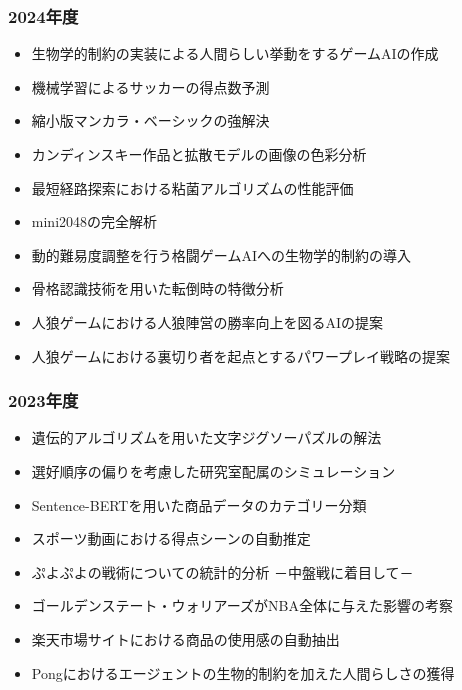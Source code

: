 \documentclass[paper=a4paper,fontsize=10.4pt]{jlreq}
\begin{document}
\begin{tcolorbox}[
colframe=gray, colback=white,
coltitle=white, colbacktitle=gray,
boxrule=0.8pt, arc=0mm,
outer arc=0mm,
sharp corners,
fonttitle=\bfseries,
enhanced,
attach boxed title to top left={xshift=5mm,yshift=-3mm},
boxed title style={frame hidden},
title=過去の卒業研究題目（過去4期分）
]
\begin{multicols}{2}
\fontsize{8bp}{11pt}\selectfont
\subsubsection*{2024年度}
\begin{itemize}[leftmargin=3mm]
  \item 生物学的制約の実装による人間らしい挙動をするゲームAIの作成
  \item 機械学習によるサッカーの得点数予測
  \item 縮小版マンカラ・ベーシックの強解決
  \item カンディンスキー作品と拡散モデルの画像の色彩分析
  \item 最短経路探索における粘菌アルゴリズムの性能評価
  \item mini2048の完全解析
  \item 動的難易度調整を行う格闘ゲームAIへの生物学的制約の導入
  \item 骨格認識技術を用いた転倒時の特徴分析
  \item 人狼ゲームにおける人狼陣営の勝率向上を図るAIの提案
  \item 人狼ゲームにおける裏切り者を起点とするパワープレイ戦略の提案
\end{itemize}
\subsubsection*{2023年度}
\begin{itemize}[leftmargin=3mm]
  \item 遺伝的アルゴリズムを用いた文字ジグソーパズルの解法
  \item 選好順序の偏りを考慮した研究室配属のシミュレーション
  \item Sentence-BERTを用いた商品データのカテゴリー分類
  \item スポーツ動画における得点シーンの自動推定
  \item ぷよぷよの戦術についての統計的分析 －中盤戦に着目して－
  \item ゴールデンステート・ウォリアーズがNBA全体に与えた影響の考察
  \item 楽天市場サイトにおける商品の使用感の自動抽出
  \item Pongにおけるエージェントの生物的制約を加えた人間らしさの獲得
\end{itemize}

\end{multicols}
\end{tcolorbox}
\end{document}

